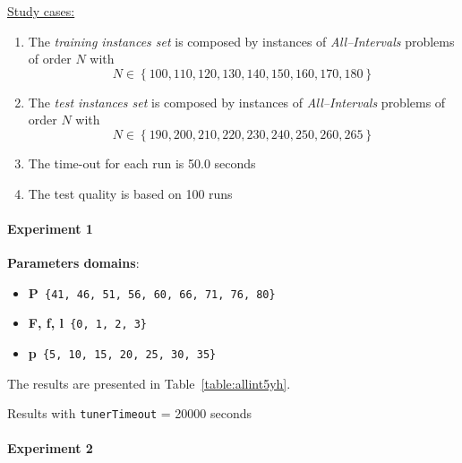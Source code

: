 \underline{Study cases:}
\begin{enumerate}
	\item The {\it training instances set} is composed by instances of {\it All--Intervals} problems of order $N$ with $$N \in \left\{100, 110, 120, 130, 140, 150, 160, 170, 180\right\}$$
	\item The {\it test instances set} is composed by instances of {\it All--Intervals} problems of order $N$ with $$N \in \left\{190, 200, 210, 220, 230, 240, 250, 260, 265\right\}$$
	\item The time-out for each run is 50.0 seconds
	\item The test quality is based on 100 runs
\end{enumerate}

\paragraph{ Experiment 1}

{\bf Parameters domains}:

\begin{itemize}[itemsep=0.2mm]
	\item {\bf P}\texttt{ \{41, 46, 51, 56, 60, 66, 71, 76, 80\}}
	\item {\bf F, f, l}\texttt{ \{0, 1, 2, 3\}}
	\item {\bf p}\texttt{ \{5, 10, 15, 20, 25, 30, 35\}}
\end{itemize}

The results are presented in Table~\ref{table:allint5yh}.

\begin{table}[H] 
	\caption{Results with \texttt{tunerTimeout} = 20000 seconds}
	\centering 
	\renewcommand{\arraystretch}{1.2}
	\label{table:allint5yh}
\end{table}

\paragraph{ Experiment 2}

